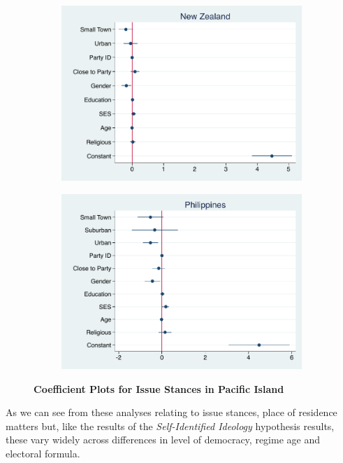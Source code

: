 \documentclass[12pt, titlepage]{article}
\newcommand\e{\emph}
\newcommand\tb{\textbf}
\begin{document}
\begin{figure}[H]
	\centering
	\begin{subfigure}[b]{0.475\textwidth}
		\centering
		\includegraphics[width=\textwidth]{LibCoef/NZealand}
	\end{subfigure}
	\hfill
	\begin{subfigure}[b]{0.475\textwidth}  
		\centering 
		\includegraphics[width=\textwidth]{LibCoef/Philippines}
	\end{subfigure}
	\caption[ \tb{Issue Stances - Pacific Islands} ]
	{\tb {Coefficient Plots for Issue Stances in Pacific Island} }
	\label{PacificLibCoef}
\end{figure}

As we can see from these analyses relating to issue stances, place of residence matters but, like the results of the \e{Self-Identified Ideology} hypothesis results, these vary widely across differences in level of democracy, regime age and electoral formula.
\end{document}
